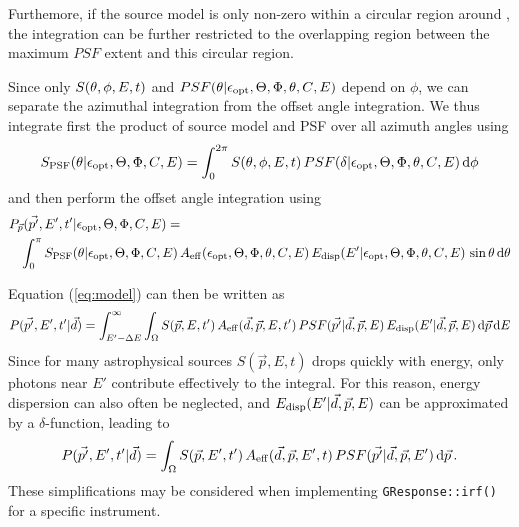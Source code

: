 \documentclass{article}[12pt,a4]
\begin{document}
Furthemore, if the source model is only non-zero within a circular region around
\srcdir, the integration can be further restricted to the overlapping region between
the maximum $PSF$ extent and this circular region.





Since only $S(\mbox{$\theta$}, \phi, E, t)$ and $PSF(\theta | \mbox{$\epsilon_{\rm opt}$}, \mbox{$\Theta$}, \mbox{$\Phi$}, \mbox{$\theta$}, \mbox{$C$}, E)$ depend on 
$\phi$, we can separate the azimuthal integration from the offset angle integration.
We thus integrate first the product of source model and PSF over all azimuth angles using
\begin{equation}
S_{\rm PSF}(\mbox{$\theta$} | \mbox{$\epsilon_{\rm opt}$}, \mbox{$\Theta$}, \mbox{$\Phi$}, \mbox{$C$}, E) = 
\int_{0}^{2 \pi} S(\mbox{$\theta$}, \phi, E, t) \, PSF(\mbox{$\delta$} | \mbox{$\epsilon_{\rm opt}$}, \mbox{$\Theta$}, \mbox{$\Phi$}, \mbox{$\theta$}, \mbox{$C$}, E) \, {\rm d}\phi
\end{equation}
and then perform the offset angle integration using
\begin{eqnarray}
\lefteqn{P_{\vec{p}}(\vec{p'}, E', t' | \opt, \zen, \azm, \conf, E) =} & & \nonumber \\
& & \int_0^{\pi}
S_{\rm PSF}(\off | \opt, \zen, \azm, \conf, E) \,
A_{\rm eff}(\opt, \zen, \azm, \off, \conf, E) \,
E_{\rm disp}(E' | \opt, \zen, \azm, \off, \conf, E) \,
\sin \off \, {\rm d}\off
\end{eqnarray}




Equation (\ref{eq:model}) can then be written as
\begin{equation}
P(\vec{p'}, E', t' | \vec{d}) = \int_{E'-\Delta E}^{\infty} \int_{\Omega} 
  S(\vec{p}, E, t') \, 
  A_{\rm eff}(\vec{d}, \vec{p}, E, t') \,
  PSF(\vec{p'} | \vec{d}, \vec{p}, E) \,
  E_{\rm disp}(E' | \vec{d}, \vec{p}, E) \, {\rm d}\vec{p} \, {\rm d}E
\label{eq:model}
\end{equation}
Since for many astrophysical sources $S(\vec{p}, E, t)$ drops quickly with energy, only
photons near $E'$ contribute effectively to the integral.
For this reason, energy dispersion can also often be neglected, and
$E_{\rm disp}(E' | \vec{d}, \vec{p}, E)$ can be approximated by a $\delta$-function,
leading to
\begin{equation}
P(\vec{p'}, E', t' | \vec{d})  = \int_{\Omega} 
  S(\vec{p}, E', t') \,
  A_{\rm eff}(\vec{d}, \vec{p}, E', t) \,
  PSF(\vec{p'} | \vec{d}, \vec{p}, E') \, {\rm d}\vec{p} \, .
\end{equation}
These simplifications may be considered when implementing 
{\tt GResponse::irf()}
for a specific instrument.
\end{document}
